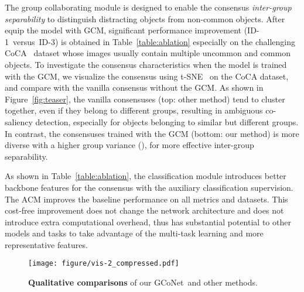 \documentclass[final]{cvpr}
\def\ourmodel{GCoNet}
\begin{document}
The group collaborating module is designed to enable the consensus \textit{inter-group separability} to distinguish distracting objects from non-common objects. 
After equip  the model with GCM, significant performance improvement (ID-1~versus~ID-3) is obtained in Table~\ref{table:ablation} especially on the challenging CoCA~\cite{zhang2020gradient} dataset whose images usually contain multiple uncommon and common objects.
To investigate the consensus characteristics when the model is trained with the GCM, we visualize the consensus using t-SNE~\cite{maaten2008visualizing} on the CoCA dataset, and compare with the vanilla consensus without the GCM.
As shown in Figure~\ref{fig:teaser}, the vanilla consensuses (top: other method) tend to cluster together, even if they belong to different groups, resulting in ambiguous co-saliency detection, especially for objects belonging to similar but different groups. 
In contrast, the consensuses trained with the GCM (bottom: our method) is more diverse with a higher group variance  (), for more effective inter-group separability. 



As shown in Table~\ref{table:ablation}, the classification module introduces better backbone features for the consensus with the auxiliary classification supervision. The ACM improves the baseline performance on all metrics and datasets. This cost-free improvement does not change the network architecture and does not introduce extra computational overhead, thus has substantial potential to other models and tasks to take advantage of the multi-task learning and more representative features.


\begin{figure*}[t!]
	\centering
	\texttt{[image: figure/vis-2\_compressed.pdf]}
\caption{\textbf{Qualitative comparisons} of our \ourmodel~and other methods.}
	\label{fig:vis}
\end{figure*}






\begin{comment}
\noindent{\bf Consensus Upper Bound Analysis.~}
To prove the importance of high-quality consensus for co-saliency objection, we analyse the consensus upper bound. We exploit the ground-truth masks of the co-saliency objects to crop the features and then use these cropped features to generate consensus. We denote it as . In this way, the consensus only contains features of the co-saliency objects and therefore it is the consensus upper bound. Then we exploit  to train and test the model. It significantly improves the performance of the baseline model, indicating the importance of a good consensus to the co-saliency detection models. Note that our approach still obtains comparable performance. It proves the effectiveness of our approach on consensus learning.
\end{comment}
\end{document}
